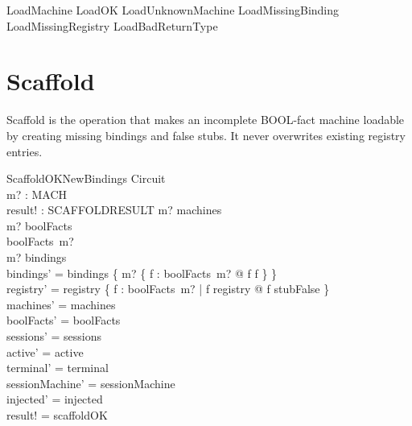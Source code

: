 \documentclass[a4paper,10pt,fleqn]{article}
\begin{document}
\begin{zed}
  LoadMachine  LoadOK \lor LoadUnknownMachine \lor LoadMissingBinding
    \lor LoadMissingRegistry \lor LoadBadReturnType
\end{zed}

\section{Scaffold}

Scaffold is the operation that makes an incomplete BOOL-fact machine loadable by
creating missing bindings and false stubs. It never overwrites existing registry
entries.


\begin{schema}{ScaffoldOKNewBindings}
  \Delta Circuit \\
  m? : MACH \\
  result! : SCAFFOLDRESULT
\where
  m? \in machines \\
  m? \in \dom boolFacts \\
  boolFacts~m? \neq \emptyset \\
  m? \notin \dom bindings \\
  bindings' = bindings \cup
    \{ m? \mapsto \{ f : boolFacts~m? @ f \mapsto f \} \} \\
  registry' = registry \oplus
    \{ f : boolFacts~m? | f \notin \dom registry @ f \mapsto stubFalse \} \\
  machines' = machines \\
  boolFacts' = boolFacts \\
  sessions' = sessions \\
  active' = active \\
  terminal' = terminal \\
  sessionMachine' = sessionMachine \\
  injected' = injected \\
  result! = scaffoldOK
\end{schema}
\end{document}
